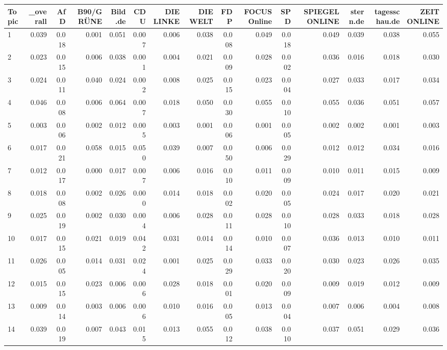 \begin{table}[ht]
\centering
\begin{tabular}{lrrrrrrrrrrrrrr}
  \hline
Topic & \_overall & AfD & B90/GRÜNE & Bild.de & CDU & DIE LINKE & DIE WELT & FDP & FOCUS Online & SPD & SPIEGEL ONLINE & stern.de & tagesschau.de & ZEIT ONLINE \\ 
  \hline
1 & 0.039 & 0.018 & 0.001 & 0.051 & 0.007 & 0.006 & 0.038 & 0.008 & 0.049 & 0.018 & 0.049 & 0.039 & 0.038 & 0.055 \\ 
  2 & 0.023 & 0.015 & 0.006 & 0.038 & 0.001 & 0.004 & 0.021 & 0.009 & 0.028 & 0.002 & 0.036 & 0.016 & 0.018 & 0.030 \\ 
  3 & 0.024 & 0.011 & 0.040 & 0.024 & 0.002 & 0.008 & 0.025 & 0.015 & 0.023 & 0.004 & 0.027 & 0.033 & 0.017 & 0.034 \\ 
  4 & 0.046 & 0.008 & 0.006 & 0.064 & 0.007 & 0.018 & 0.050 & 0.030 & 0.055 & 0.010 & 0.055 & 0.036 & 0.051 & 0.057 \\ 
  5 & 0.003 & 0.006 & 0.002 & 0.012 & 0.005 & 0.003 & 0.001 & 0.006 & 0.001 & 0.005 & 0.002 & 0.002 & 0.001 & 0.003 \\ 
  6 & 0.017 & 0.021 & 0.058 & 0.015 & 0.050 & 0.039 & 0.007 & 0.050 & 0.006 & 0.029 & 0.012 & 0.012 & 0.034 & 0.016 \\ 
  7 & 0.012 & 0.017 & 0.000 & 0.017 & 0.007 & 0.006 & 0.016 & 0.010 & 0.011 & 0.009 & 0.010 & 0.011 & 0.015 & 0.009 \\ 
  8 & 0.018 & 0.008 & 0.002 & 0.026 & 0.000 & 0.014 & 0.018 & 0.002 & 0.020 & 0.005 & 0.024 & 0.017 & 0.020 & 0.021 \\ 
  9 & 0.025 & 0.019 & 0.002 & 0.030 & 0.004 & 0.006 & 0.028 & 0.011 & 0.028 & 0.010 & 0.028 & 0.033 & 0.018 & 0.028 \\ 
  10 & 0.017 & 0.015 & 0.021 & 0.019 & 0.042 & 0.031 & 0.014 & 0.014 & 0.010 & 0.007 & 0.036 & 0.013 & 0.010 & 0.011 \\ 
  11 & 0.026 & 0.005 & 0.014 & 0.031 & 0.024 & 0.001 & 0.025 & 0.029 & 0.033 & 0.020 & 0.030 & 0.023 & 0.026 & 0.035 \\ 
  12 & 0.015 & 0.015 & 0.023 & 0.006 & 0.006 & 0.028 & 0.018 & 0.001 & 0.020 & 0.009 & 0.009 & 0.019 & 0.012 & 0.009 \\ 
  13 & 0.009 & 0.014 & 0.003 & 0.006 & 0.006 & 0.010 & 0.016 & 0.005 & 0.013 & 0.004 & 0.007 & 0.006 & 0.004 & 0.008 \\ 
  14 & 0.039 & 0.019 & 0.007 & 0.043 & 0.015 & 0.013 & 0.055 & 0.012 & 0.038 & 0.010 & 0.037 & 0.051 & 0.029 & 0.036 \\ 

\end{tabular}
\end{table}
